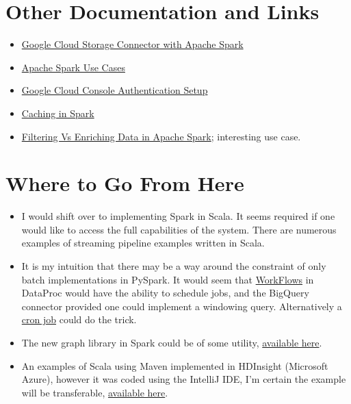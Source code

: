 \documentclass[english]{article}
\begin{document}
\section{Other Documentation and Links}
\begin{itemize}
\item \href{https://cloud.google.com/dataproc/docs/tutorials/gcs-connector-spark-tutorial}{Google Cloud Storage Connector with Apache Spark}
\item \href{https://www.qubole.com/blog/apache-spark-use-cases/}{Apache Spark Use Cases}
\item \href{https://cloud.google.com/docs/authentication/getting-started}{Google Cloud Console Authentication Setup}
\item \href{https://jaceklaskowski.gitbooks.io/mastering-apache-spark/spark-rdd-caching.html}{Caching in Spark}
\item \href{https://medium.com/capital-one-tech/filtering-vs-enriching-data-in-apache-spark-e44108c3a372}{Filtering Vs Enriching Data in Apache Spark}; interesting use case.
\end{itemize}
\section{Where to Go From Here}
\begin{itemize}
\item I would shift over to implementing Spark in Scala. It seems required if one would like to access the full capabilities of the system. There are numerous examples of streaming pipeline examples written in Scala.
\item It is my intuition that there may be a way around the constraint of only batch implementations in PySpark. It would seem that \href{https://cloud.google.com/dataproc/docs/concepts/workflows/overview}{WorkFlows} in DataProc would have the ability to schedule jobs, and the BigQuery connector provided one could implement a windowing query. Alternatively a \href{https://stackoverflow.com/questions/30375571/running-scheduled-spark-job}{cron job} could do the trick.
\item The new graph library in Spark could be of some utility, \href{https://spark.apache.org/docs/latest/graphx-programming-guide.html}{available here}.
\item An examples of Scala using Maven implemented in HDInsight (Microsoft Azure), however it was coded using the IntelliJ IDE, I'm certain the example will be transferable, \href{https://docs.microsoft.com/bs-latn-ba/azure/hdinsight/spark/apache-spark-create-standalone-application}{available here}.
\end{itemize}
\end{document}
